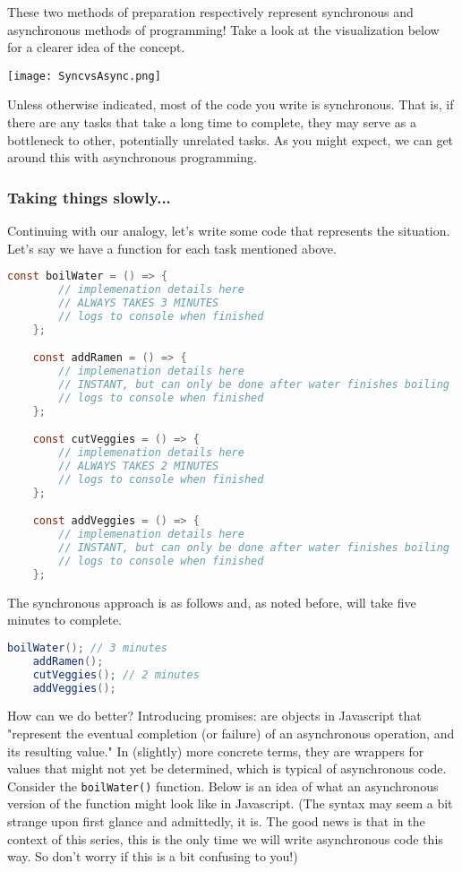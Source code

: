 These two methods of preparation respectively represent synchronous and asynchronous methods of programming! Take a look at the visualization below for a clearer idea of the concept.

\begin{center}
    \texttt{[image: SyncvsAsync.png]}
\end{center}

Unless otherwise indicated, most of the code you write is synchronous. That is, if there are any tasks that take a long time to complete, they may serve as a bottleneck to other, potentially unrelated tasks. As you might expect, we can get around this with asynchronous programming. 

\subsubsection*{Taking things slowly...}
Continuing with our analogy, let's write some code that represents the situation. Let's say we have a function for each task mentioned above.

\begin{lstlisting}[language=Java]
    const boilWater = () => {
        // implemenation details here
        // ALWAYS TAKES 3 MINUTES
        // logs to console when finished
    };

    const addRamen = () => {
        // implemenation details here
        // INSTANT, but can only be done after water finishes boiling
        // logs to console when finished
    };

    const cutVeggies = () => {
        // implemenation details here
        // ALWAYS TAKES 2 MINUTES
        // logs to console when finished
    };

    const addVeggies = () => {
        // implemenation details here
        // INSTANT, but can only be done after water finishes boiling
        // logs to console when finished
    };
\end{lstlisting}

The synchronous approach is as follows and, as noted before, will take five minutes to complete.

\begin{lstlisting}[language=Java] 
    boilWater(); // 3 minutes
    addRamen();
    cutVeggies(); // 2 minutes
    addVeggies();
\end{lstlisting}

How can we do better? Introducing promises:  are objects in Javascript that "represent the eventual completion (or failure) of an asynchronous operation, and its resulting value." In (slightly) more concrete terms, they are wrappers for values that might not yet be determined, which is typical of asynchronous code. Consider the \texttt{boilWater()} function. Below is an idea of what an asynchronous version of the function might look like in Javascript. (The syntax may seem a bit strange upon first glance and admittedly, it is. The good news is that in the context of this series, this is the only time we will write asynchronous code this way. So don't worry if this is a bit confusing to you!)

